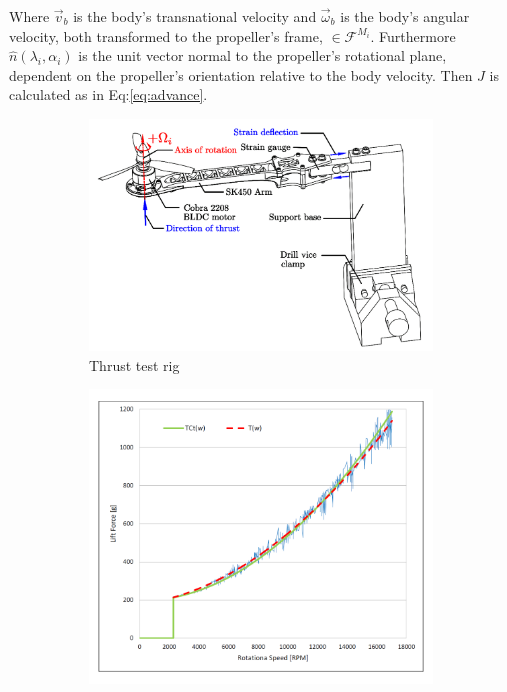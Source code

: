 Where $\vec{v}_b$ is the body's transnational velocity and $\vec{\omega}_b$ is the body's angular velocity, both transformed to the propeller's frame, $\in\mathcal{F}^{M_i}$. Furthermore $\hat{n}(\lambda_i,\alpha_i)$ is the unit vector normal to the propeller's rotational plane, dependent on the propeller's orientation relative to the body velocity. Then $J$ is calculated as in Eq:\ref{eq:advance}.
\begin{figure}[htbp]
\begin{subfigure}{0.5\textwidth}
\centering
\includegraphics[width=\textwidth]{figs/thrust-rig}
\caption{Thrust test rig}
\label{fig:thrust-rig}
\end{subfigure}
\begin{subfigure}{0.5\textwidth}
\centering
\includegraphics[width=\textwidth]{graphs/thrust-plot}

\end{subfigure}
\end{figure}
